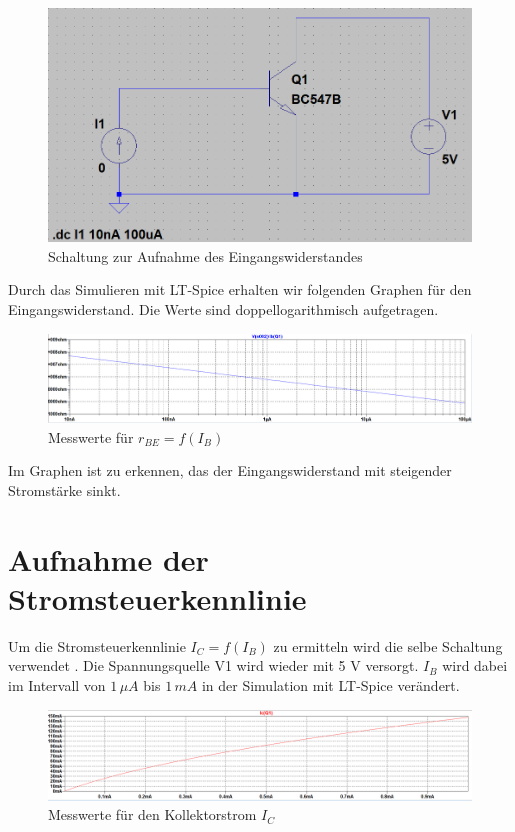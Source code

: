        \begin{figure}[!ht]
            \centering
            \includegraphics[width=0.5\linewidth]{Bilder/22aufbau.PNG}
            \caption{Schaltung zur Aufnahme des Eingangswiderstandes}
            \label{fig:22}
        \end{figure}

        Durch das Simulieren mit LT-Spice erhalten wir folgenden Graphen für den Eingangswiderstand. Die Werte sind doppellogarithmisch aufgetragen.

        \begin{figure}[!ht]
            \centering
            \includegraphics[width=\linewidth]{Bilder/22graph.PNG}
            \caption{Messwerte für \(r_{BE}=f(I_B)\)}
        \end{figure}

        Im Graphen ist zu erkennen, das der Eingangswiderstand mit steigender Stromstärke sinkt.

        \newpage
    \section{Aufnahme der Stromsteuerkennlinie}
        Um die Stromsteuerkennlinie \(I_C=f(I_B)\) zu ermitteln wird die selbe Schaltung verwendet . Die Spannungsquelle V1 wird wieder mit 5 V versorgt. \(I_B\) wird dabei im Intervall von \(1\,\mu A\) bis \(1\,mA\) in der Simulation mit LT-Spice verändert. 

        \begin{figure}[!ht]
            \centering
            \includegraphics[width=\linewidth]{Bilder/23graph.PNG}
            \caption{Messwerte für den Kollektorstrom \(I_C\)}
        \end{figure}

